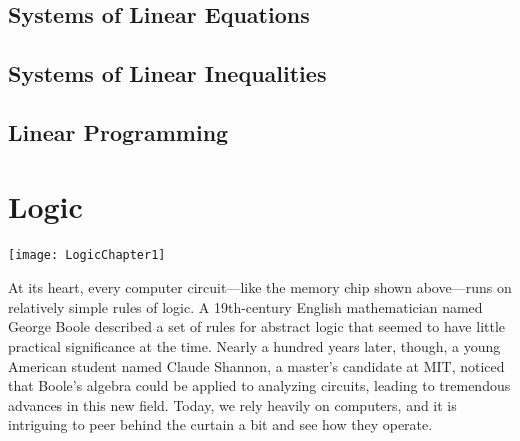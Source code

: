 \documentclass[9pt,letter,twoside,openright]{memoir}
\begin{document}
\section{Systems of Linear Equations}



\section{Systems of Linear Inequalities}



\section{Linear Programming}



\chapter{Logic}
\begin{center}\texttt{[image: LogicChapter1]}\end{center}

At its heart, every computer circuit---like the memory chip shown above---runs on relatively simple rules of logic.  A 19th-century English mathematician named George Boole described a set of rules for abstract logic that seemed to have little practical significance at the time.  Nearly a hundred years later, though, a young American student named Claude Shannon, a master's candidate at MIT, noticed that Boole's algebra could be applied to analyzing circuits, leading to tremendous advances in this new field.  Today, we rely heavily on computers, and it is intriguing to peer behind the curtain a bit and see how they operate.
\end{document}
